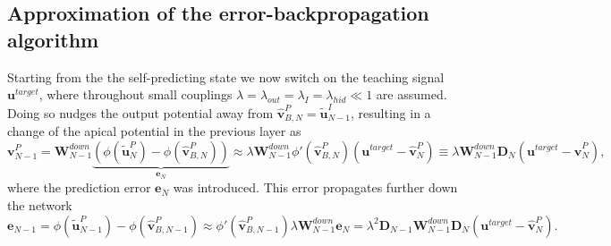 \documentclass[12pt,a4paper]{article}
\begin{document}
\subsection{Approximation of the error-backpropagation algorithm}
Starting from the the self-predicting state we now switch on the teaching signal $\bm{u}^{target}$, where throughout small couplings $\lambda = \lambda_{out} = \lambda_I = \lambda_{hid}\ll 1$ are assumed.\\
Doing so nudges the output potential away from $\hat{\bm{v}}^P_{B,N} = \tilde{\bm{u}}^I_{N-1}$, resulting in a change of the apical potential in the previous layer as
\begin{equation}
\bm{v}^P_{N-1} = \bm{W}^{down}_{N-1}\underbrace{\left(\phi(\tilde{\bm{u}}^P_N) - \phi(\hat{\bm{v}}^P_{B, N})\right)}_{\bm{e}_N} \approx \lambda\bm{W}^{down}_{N-1}\phi'(\hat{\bm{v}}^P_{B, N})\left(\bm{u}^{target} - \hat{\bm{v}}^P_{N}\right)\equiv \lambda\bm{W}^{down}_{N-1}\bm{D}_N\left(\bm{u}^{target} - \hat{\bm{v}}^P_{N}\right),
\end{equation}
where the prediction error $\bm{e}_N$ was introduced. This error propagates further down the network
\begin{equation}
\bm{e}_{N-1} = \phi(\tilde{\bm{u}}^P_{N-1}) - \phi(\hat{\bm{v}}^P_{B,N-1}) \approx \phi'(\hat{\bm{v}}^P_{B,N-1}) \lambda \bm{W}^{down}_{N-1}\bm{e}_N = \lambda^2 \bm{D}_{N-1}\bm{W}^{down}_{N-1}\bm{D}_N\left(\bm{u}^{target} - \hat{\bm{v}}^P_{N}\right).
\end{equation}
\end{document}
